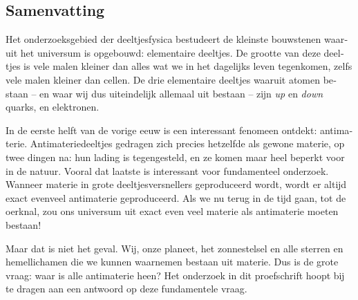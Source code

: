 
\begin{otherlanguage}{dutch}

\chapter*{Samenvatting}
\setcounter{equation}{0}
\setcounter{figure}{0}

Het onderzoeksgebied der deeltjesfysica bestudeert de kleinste bouwstenen waaruit het universum is opgebouwd: elementaire deeltjes.
De grootte van deze deeltjes is vele malen kleiner dan alles wat we in het dagelijks leven tegenkomen, zelfs vele malen kleiner dan cellen.
De drie elementaire deeltjes waaruit atomen bestaan -- en waar wij dus uiteindelijk allemaal uit bestaan -- zijn \emph{up} en \emph{down} quarks, en elektronen.

In de eerste helft van de vorige eeuw is een interessant fenomeen ontdekt: antimaterie.
Antimateriedeeltjes gedragen zich precies hetzelfde als gewone materie, op twee dingen na: hun lading is tegengesteld, en ze komen maar heel beperkt voor in de natuur.
Vooral dat laatste is interessant voor fundamenteel onderzoek.
Wanneer materie in grote deeltjesversnellers geproduceerd wordt, wordt er altijd exact evenveel antimaterie geproduceerd.
Als we nu terug in de tijd gaan, tot de oerknal, zou ons universum uit exact even veel materie als antimaterie moeten bestaan!

Maar dat is niet het geval.
Wij, onze planeet, het zonnestelsel en alle sterren en hemellichamen die we kunnen waarnemen bestaan uit materie.
Dus is de grote vraag: waar is alle antimaterie heen?
Het onderzoek in dit proefschrift hoopt bij te dragen aan een antwoord op deze fundamentele vraag.

\begin{figure}[htb] \centerfloat
\end{figure}
\end{otherlanguage}
